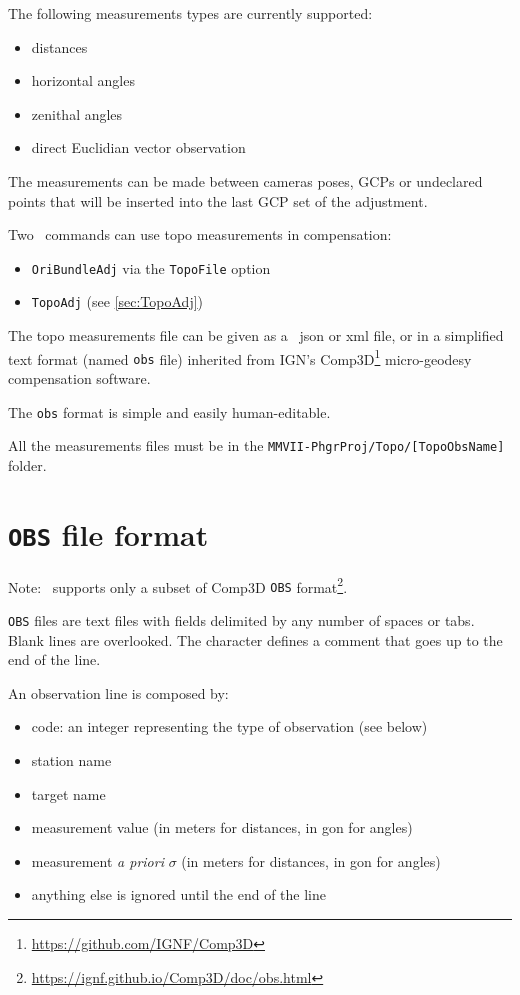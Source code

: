 The following measurements types are currently supported:

\begin{itemize}
    \item distances
    \item horizontal angles
    \item zenithal angles
    \item direct Euclidian vector observation
\end{itemize}

The measurements can be made between cameras poses, GCPs or undeclared points that will be inserted into the last GCP set of the adjustment.


Two \CdPPP\ commands can use topo measurements in compensation:
\begin{itemize}
    \item {\tt OriBundleAdj} via the {\tt TopoFile} option
    \item {\tt TopoAdj} (see \ref{sec:TopoAdj})
\end{itemize}

The topo measurements file can be given as a \CdPPP\ json or xml file, or in a simplified text format (named {\tt obs} file) inherited from IGN's Comp3D\footnote{\url{https://github.com/IGNF/Comp3D}} micro-geodesy compensation software.

The {\tt obs} format is simple and easily human-editable.

All the measurements files must be in the {\tt MMVII-PhgrProj/Topo/[TopoObsName]} folder.

\section{\texttt{OBS} file format}
\label{sec:compObsFormat}

Note: \CdPPP\ supports only a subset of Comp3D {\tt OBS} format\footnote{\url{https://ignf.github.io/Comp3D/doc/obs.html}}.

{\tt OBS} files are text files with fields delimited by any number of spaces or tabs. Blank lines are overlooked.
The {\tt *} character defines a comment that goes up to the end of the line.

An observation line is composed by:

\begin{itemize}
    \item code: an integer representing the type of observation (see below)
    \item station name
    \item target name
    \item measurement value (in meters for distances, in gon for angles)
    \item measurement \textit{a priori} $\sigma$ (in meters for distances, in gon for angles)
    \item anything else is ignored until the end of the line
\end{itemize}

